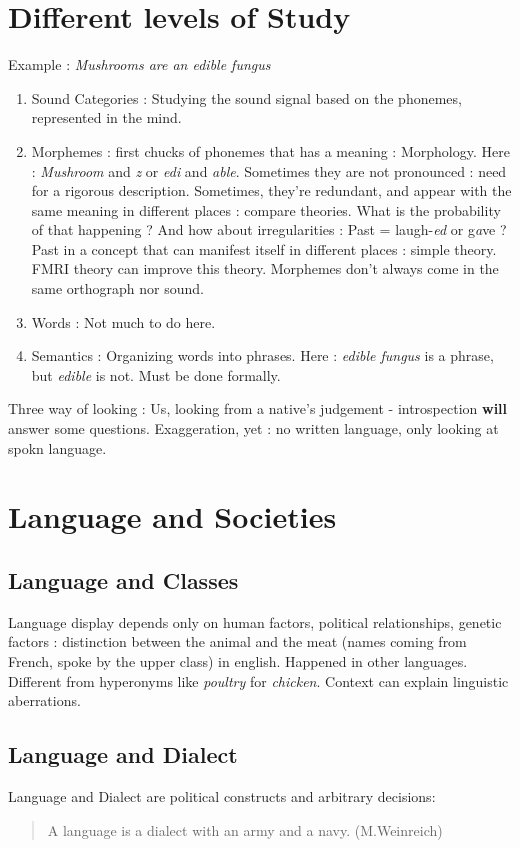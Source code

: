 \documentclass{cours}
\begin{document}
\section{Different levels of Study}
Example : \textsl{Mushrooms are an edible fungus}
\begin{enumerate}
    \item Sound Categories : Studying the sound signal based on the phonemes, represented in the mind.  
    \item Morphemes : first chucks of phonemes that has a meaning : Morphology. Here : \textsl{Mushroom} and \textsl{z} or \textsl{edi} and \textsl{able}. Sometimes they are not pronounced : need for a rigorous description. Sometimes, they're redundant, and appear with the same meaning in different places : compare theories. What is the probability of that happening ? And how about irregularities : Past = laugh-\textit{ed} or g\textit{a}ve ? Past in a concept that can manifest itself in different places : simple theory. FMRI theory can improve this theory. Morphemes don't always come in the same orthograph nor sound.
    \item Words : Not much to do here. 
    \item Semantics : Organizing words into phrases. Here : \textsl{edible fungus} is a phrase, but \textsl{edible} is not. Must be done formally.
\end{enumerate}
Three way of looking : Us, looking from a native's judgement - introspection \textbf{will} answer some questions. 
Exaggeration, yet : no written language, only looking at spokn language. 

\section{Language and Societies}
    \subsection{Language and Classes}
        Language display depends only on human factors, political relationships, genetic factors : distinction between the animal and the meat (names coming from French, spoke by the upper class) in english. Happened in other languages. Different from hyperonyms like \textit{poultry} for \textit{chicken}. Context can explain linguistic aberrations. 
    \subsection{Language and Dialect}
        Language and Dialect are political constructs and arbitrary decisions: \begin{quote}
            A language is a dialect with an army and a navy. (M.Weinreich)
        \end{quote} 
\end{document}
